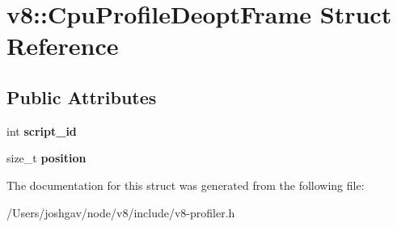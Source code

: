 \hypertarget{structv8_1_1_cpu_profile_deopt_frame}{}\section{v8\+:\+:Cpu\+Profile\+Deopt\+Frame Struct Reference}
\label{structv8_1_1_cpu_profile_deopt_frame}
\subsection*{Public Attributes}
\begin{DoxyCompactItemize}
\item 
int {\bfseries script\+\_\+id}\hypertarget{structv8_1_1_cpu_profile_deopt_frame_af7b750288458a70a81b4c05869b8f6d7}{}\label{structv8_1_1_cpu_profile_deopt_frame_af7b750288458a70a81b4c05869b8f6d7}

\item 
size\+\_\+t {\bfseries position}\hypertarget{structv8_1_1_cpu_profile_deopt_frame_a4f82d1517fd15573bb2890961496a76f}{}\label{structv8_1_1_cpu_profile_deopt_frame_a4f82d1517fd15573bb2890961496a76f}

\end{DoxyCompactItemize}


The documentation for this struct was generated from the following file\+:\begin{DoxyCompactItemize}
\item 
/\+Users/joshgav/node/v8/include/v8-\/profiler.\+h\end{DoxyCompactItemize}
